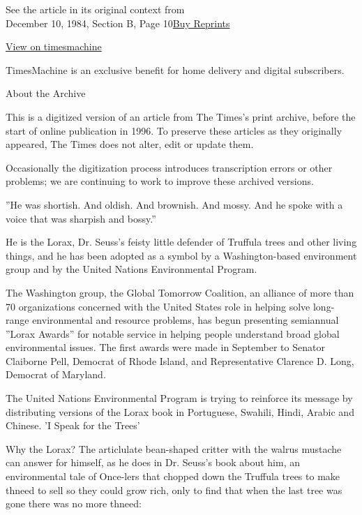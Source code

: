 See the article in its original context from\\
December 10, 1984, Section B, Page
10\href{https://store.nytimes.com/collections/new-york-times-page-reprints?utm_source=nytimes\&utm_medium=article-page\&utm_campaign=reprints}{Buy
Reprints}

\href{http://timesmachine.nytimes.com/timesmachine/1984/12/10/139916.html}{View
on timesmachine}

TimesMachine is an exclusive benefit for home delivery and digital
subscribers.

About the Archive

This is a digitized version of an article from The Times's print
archive, before the start of online publication in 1996. To preserve
these articles as they originally appeared, The Times does not alter,
edit or update them.

Occasionally the digitization process introduces transcription errors or
other problems; we are continuing to work to improve these archived
versions.

''He was shortish. And oldish. And brownish. And mossy. And he spoke
with a voice that was sharpish and bossy.''

He is the Lorax, Dr. Seuss's feisty little defender of Truffula trees
and other living things, and he has been adopted as a symbol by a
Washington-based environment group and by the United Nations
Environmental Program.

The Washington group, the Global Tomorrow Coalition, an alliance of more
than 70 organizations concerned with the United States role in helping
solve long-range environmental and resource problems, has begun
presenting semiannual ''Lorax Awards'' for notable service in helping
people understand broad global environmental issues. The first awards
were made in September to Senator Claiborne Pell, Democrat of Rhode
Island, and Representative Clarence D. Long, Democrat of Maryland.

The United Nations Environmental Program is trying to reinforce its
message by distributing versions of the Lorax book in Portuguese,
Swahili, Hindi, Arabic and Chinese. 'I Speak for the Trees'

Why the Lorax? The articlulate bean-shaped critter with the walrus
mustache can answer for himself, as he does in Dr. Seuss's book about
him, an environmental tale of Once-lers that chopped down the Truffula
trees to make thneed to sell so they could grow rich, only to find that
when the last tree was gone there was no more thneed:

